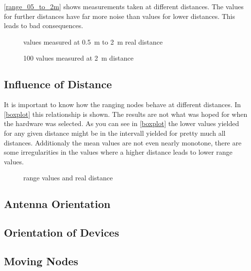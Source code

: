 \autoref{range_05_to_2m} shows measurements taken at different distances.
The values for further distances have far more noise than values for lower distances.
This leads to bad consequences.
\begin{figure}[H]
	\centering
	
	\caption{values measured at \SI{0.5}{\metre} to \SI{2}{\metre} real distance}
	\label{range_05_to_2m}
\end{figure}

\begin{figure}[H]
	\centering
	
	\caption{100 values measured at \SI{2}{\metre} distance}
	\label{2m}
\end{figure}

\subsection{Influence of Distance}

It is important to know how the ranging nodes behave at different distances.
In \autoref{boxplot} this relationship is shown.
The results are not what was hoped for when the hardware was selected.
As you can see in \autoref{boxplot} the lower values yielded for any given distance might be in the intervall yielded for pretty much all distances.
Additionaly the mean values are not even nearly monotone, there are some irregularities in the values where a higher distance leads to lower range values.
\begin{landscape}
	\begin{figure}[H]
		\centering
		
		\caption{range values and real distance}
		\label{boxplot}
	\end{figure}
\end{landscape}

\subsection{Antenna Orientation}



\subsection{Orientation of Devices}


\subsection{Moving Nodes}

